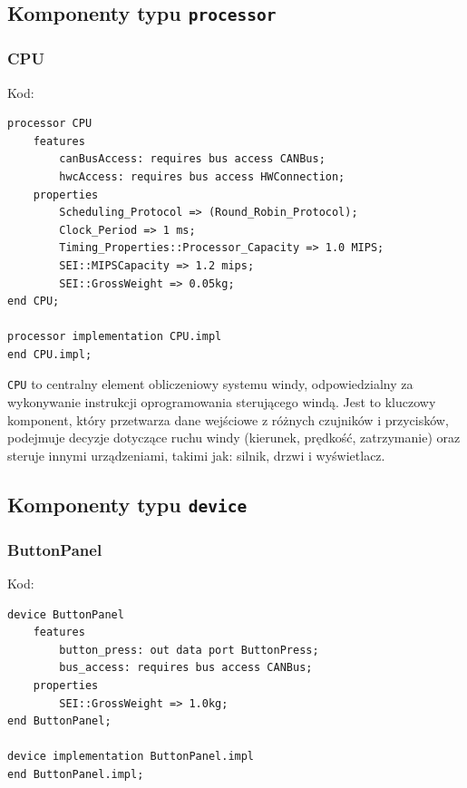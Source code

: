 \documentclass{article}
\begin{document}
    \subsection{Komponenty typu \texttt{processor}}

    
    \subsubsection{CPU}

    Kod:
    
    \begin{lstlisting}[basicstyle=\ttfamily, keywordstyle=\bfseries]
processor CPU
    features
        canBusAccess: requires bus access CANBus;
        hwcAccess: requires bus access HWConnection;
    properties
        Scheduling_Protocol => (Round_Robin_Protocol);
        Clock_Period => 1 ms;	
        Timing_Properties::Processor_Capacity => 1.0 MIPS;
        SEI::MIPSCapacity => 1.2 mips;
        SEI::GrossWeight => 0.05kg;
end CPU;

processor implementation CPU.impl
end CPU.impl;
    \end{lstlisting}

    \texttt{CPU} to centralny element obliczeniowy systemu windy, odpowiedzialny za wykonywanie instrukcji oprogramowania sterującego windą. Jest to kluczowy komponent, który przetwarza dane wejściowe z różnych czujników i przycisków, podejmuje decyzje dotyczące ruchu windy (kierunek, prędkość, zatrzymanie) oraz steruje innymi urządzeniami, takimi jak: silnik, drzwi i wyświetlacz. 




    \subsection{Komponenty typu \texttt{device}}

    
    \subsubsection{ButtonPanel}

    Kod:
    
    \begin{lstlisting}[basicstyle=\ttfamily, keywordstyle=\bfseries]
device ButtonPanel
    features
        button_press: out data port ButtonPress;
        bus_access: requires bus access CANBus;
    properties
        SEI::GrossWeight => 1.0kg;
end ButtonPanel;

device implementation ButtonPanel.impl
end ButtonPanel.impl;
    \end{lstlisting}
\end{document}
